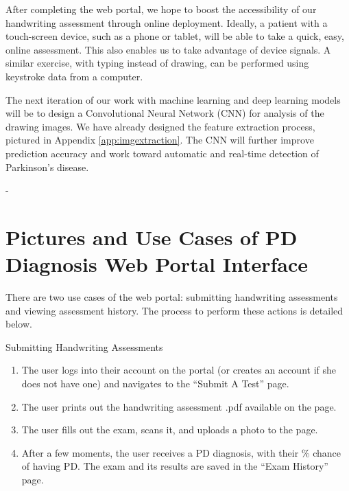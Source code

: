 \documentclass[pmlr,twocolumn,10pt]{jmlr} %
\def\UrlBreaks{\do\/\do-}
\newcommand\red[1]{{\color{red}#1}}
\begin{document}
After completing the web portal, we hope to boost the accessibility of our handwriting assessment through online deployment. Ideally, a patient with a touch-screen device, such as a phone or tablet, will be able to take a quick, easy, online assessment. This also enables us to take advantage of device signals. A similar exercise, with typing instead of drawing, can be performed using keystroke data from a computer.

The next iteration of our work with machine learning and deep learning models will be to design a Convolutional Neural Network (CNN) for analysis of the drawing images. We have already designed the feature extraction process, pictured in Appendix \ref{app:imgextraction}. The CNN will further improve prediction accuracy and work toward automatic and real-time detection of Parkinson’s disease. %

\clearpage



\UrlBreaks
\nocite{*}
\justifying

\clearpage
\appendix

\section{Pictures and Use Cases of PD Diagnosis Web Portal Interface}
\label{app:webportal}

There are two use cases of the web portal: submitting handwriting assessments and viewing assessment history. The process to perform these actions is detailed below.

Submitting Handwriting Assessments

\begin{enumerate}
\item The user logs into their account on the portal (or creates an account if she does not have one) and navigates to the “Submit A Test” page.
\item The user prints out the handwriting assessment .pdf available on the page.
\item 
The user fills out the exam, scans it, and uploads a photo to the page.
\item After a few moments, the user receives a PD diagnosis, with their \% chance of having PD. The exam and its results are saved in the “Exam History” page.
\end{enumerate}
\end{document}
